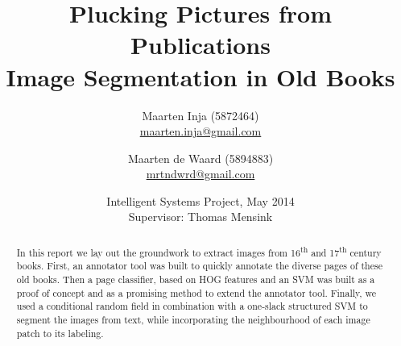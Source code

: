 \documentclass{article}
\title{Plucking Pictures from Publications\\ \large
Image Segmentation in Old Books}
\author{Maarten Inja (5872464)\\\small\url{maarten.inja@gmail.com} \and Maarten de
Waard (5894883)\\\small\url{mrtndwrd@gmail.com}}
\date{Intelligent Systems Project, May 2014\\
Supervisor: Thomas Mensink}
\begin{document}
\maketitle


\begin{abstract}
In this report we lay out the groundwork to extract images from 16\textsuperscript{th} and
17\textsuperscript{th} century books. First, an annotator tool was built to
quickly annotate the diverse pages of these old books. Then a page classifier,
based on HOG features and an SVM was built as a proof of concept and as a
promising method to extend the annotator tool. Finally, we used a
conditional random field in combination with a one-slack structured SVM to
segment the images from text, while incorporating the neighbourhood of each
image patch to its labeling.
\end{abstract}






















\newpage

\end{document}
